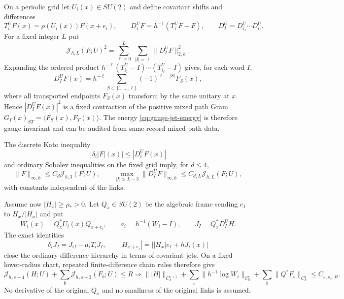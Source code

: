 \documentclass[11pt]{article}
\numberwithin{equation}{section}
\theoremstyle{definition}
\theoremstyle{remark}
\newcommand{\norm}[1]{\lVert#1\rVert}
\begin{document}
On a periodic grid let $U_i(x)\in SU(2)$ and define covariant shifts and differences
\begin{equation}
 T_i^UF(x)=\rho(U_i(x))F(x+e_i),\qquad
 D_i^UF=h^{-1}(T_i^UF-F),\qquad D_I^U=D_{i_1}^U\cdots D_{i_\ell}^U.
 \label{eq:gauge-covdiff}
\end{equation}
For a fixed integer $L$ put
\begin{equation}
 \mathcal J_{h,L}(F;U)^2
 =\sum_{\ell=0}^L\ \sum_{|I|=\ell}\norm{D_I^UF}_{2,h}^2.
 \label{eq:gauge-jet-energy}
\end{equation}
Expanding the ordered product $h^{-\ell}(T_{i_1}^U-I)\cdots(T_{i_\ell}^U-I)$ gives, for each word $I$,
\begin{equation}
 D_I^UF(x)=h^{-\ell}\sum_{S\subset\{1,\ldots,\ell\}}(-1)^{\ell-|S|}F_S(x),
 \label{eq:gauge-path-expansion}
\end{equation}
where all transported endpoints $F_S(x)$ transform by the same unitary at $x$.  Hence $|D_I^UF(x)|^2$ is a fixed contraction of the positive mixed path Gram $G_I(x)_{ST}=\langle F_S(x),F_T(x)\rangle$.  The energy \eqref{eq:gauge-jet-energy} is therefore gauge invariant and can be audited from same-record mixed path data.

The discrete Kato inequality
\begin{equation}
 |\delta_i|F|(x)|\le |D_i^UF(x)|
 \label{eq:gauge-Kato}
\end{equation}
and ordinary Sobolev inequalities on the fixed grid imply, for $d\le4$,
\begin{equation}
 \norm F_{\infty,h}\le C_d\mathcal J_{h,3}(F;U),\qquad
 \max_{|I|\le L-3}\norm{D_I^UF}_{\infty,h}
 \le C_{d,L}\mathcal J_{h,L}(F;U),
 \label{eq:gauge-cov-embed}
\end{equation}
with constants independent of the links.

Assume now $|H_x|\ge\rho_*>0$.  Let $Q_x\in SU(2)$ be the algebraic frame sending $e_1$ to $H_x/|H_x|$ and put
\begin{equation}
 W_i(x)=Q_x^*U_i(x)Q_{x+e_i},\qquad
 a_i=h^{-1}(W_i-I),\qquad J_I=Q_x^*D_I^UH.
 \label{eq:gauge-normalized}
\end{equation}
The exact identities
\begin{equation}
 \delta_iJ_I=J_{iI}-a_iT_iJ_I,
 \qquad |H_{x+e_i}|=\bigl||H_x|e_1+hJ_i(x)\bigr|
 \label{eq:gauge-closed}
\end{equation}
close the ordinary difference hierarchy in terms of covariant jets.  On a fixed lower-radius chart, repeated finite-difference chain rules therefore give
\begin{equation}
 \mathcal J_{h,s+4}(H;U)+\sum_b\mathcal J_{h,s+3}(F_b;U)\le R
 \Longrightarrow
 \norm{|H|}_{C_h^{s+1}}
 +\sum_i\norm{h^{-1}\log W_i}_{C_h^s}
 +\sum_b\norm{Q^*F_b}_{C_h^s}
 \le C_{s,\rho_*,R}.
 \label{eq:gauge-normalized-reader}
\end{equation}
No derivative of the original $Q_x$ and no smallness of the original links is assumed.
\end{document}
